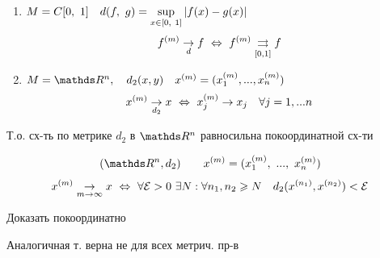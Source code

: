 \documentclass[main]{subfiles}
\begin{document}
	\begin{examples}
		\begin{enumerate}
			\item $M = C[0,\ 1] \quad d(f,\ g) = \displaystyle \sup_{x \in [0,\ 1]} |f(x) - g(x)|$
			      \[f^{(m)} \underset{d}{\to} f \ \Leftrightarrow\  f^{(m)} \underset{[0, 1]}{\rightrightarrows} f\]
			\item $M = \R^n,\q d_2(x, y) \q x^{(m)} = (x_1^{(m)},  ..., x_n^{(m)})$
			      \[x^{(m)} \underset{d_2}{\to} x \ \Leftrightarrow\  x^{(m)}_j \to x_j \quad \forall j = 1,...n\]
		\end{enumerate}
		Т.о. сх-ть по метрике $d_2$ в $\R^n$ равносильна покоординатной сх-ти
	\end{examples}

	\begin{Theorem}
		\[(\R^n, d_2) \qq x^{(m)}=(x_1^{(m)},\ ...,\ x_n^{(m)})\]
		\[x^{(m)} \underset{m \to \infty}{\to} x \ \Leftrightarrow\  \forall \mathcal{E} > 0\ \exists N: \forall n_1, n_2 \geqslant N\quad d_2(x^{(n_1)}, x^{(n_2)}) < \mathcal{E}\]
	\end{Theorem}

	\begin{upr}
		Доказать покоординатно
	\end{upr}

	\begin{remark}
		Аналогичная т. верна не для всех метрич. пр-в
	\end{remark}
\end{document}
